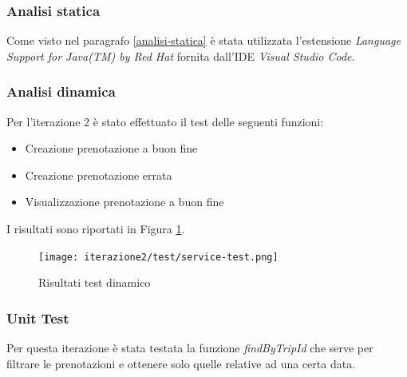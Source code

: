 \subsubsection{Analisi statica}
Come visto nel paragrafo \ref{analisi-statica} è stata utilizzata l'estensione \textit{Language Support for Java(TM) by Red Hat} fornita
dall'IDE \textit{Visual Studio Code}.

\subsubsection{Analisi dinamica}
Per l'iterazione 2 è stato effettuato il test delle seguenti funzioni:
\begin{itemize}
  \item Creazione prenotazione a buon fine
  \item Creazione prenotazione errata
  \item Visualizzazione prenotazione a buon fine
\end{itemize}

I risultati sono riportati in Figura \ref{Risultati test dinamico iterazione 2}. 

\begin{figure}[htbp]
    \texttt{[image: iterazione2/test/service-test.png]}
    \centering
    \caption{Risultati test dinamico}
    \label{Risultati test dinamico iterazione 2}
\end{figure}

\subsubsection{Unit Test}
Per questa iterazione è stata testata la funzione \textit{findByTripId} che serve per filtrare le prenotazioni e ottenere solo quelle relative ad una certa data.

\clearpage

